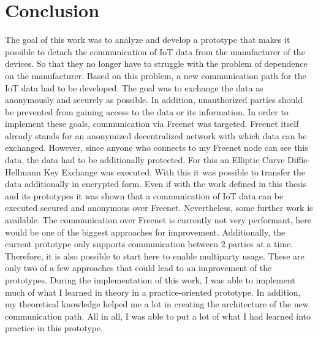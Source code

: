 \chapter{Conclusion}
The goal of this work was to analyze and develop a prototype that makes it possible to detach the communication of IoT data from the manufacturer of the devices. So that they no longer have to struggle with the problem of dependence on the manufacturer. 
Based on this problem, a new communication path for the IoT data had to be developed. The goal was to exchange the data as anonymously and securely as possible. 
In addition, unauthorized parties should be prevented from gaining access to the data or its information.
In order to implement these goals, communication via Freenet was targeted. Freenet itself already stands for an anonymized decentralized network with which data can be exchanged. 
However, since anyone who connects to my Freenet node can see this data, the data had to be additionally protected.
For this an Elliptic Curve Diffie-Hellmann Key Exchange was executed. With this it was possible to transfer the data additionally in encrypted form.
Even if with the work defined in this thesis and its prototypes it was shown that a communication of IoT data can be executed secured and anonymous over Freenet. Nevertheless, some further work is available. 
The communication over Freenet is currently not very performant, here would be one of the biggest approaches for improvement. Additionally, the current prototype only supports communication between 2 parties at a time. Therefore, it is also possible to start here to enable multiparty usage. 
These are only two of a few approaches that could lead to an improvement of the prototypes.
During the implementation of this work, I was able to implement much of what I learned in theory in a practice-oriented prototype. In addition, my theoretical knowledge helped me a lot in creating the architecture of the new communication path. All in all, I was able to put a lot of what I had learned into practice in this prototype.